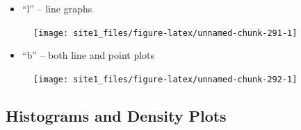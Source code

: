 \documentclass[]{book}
\newenvironment{Shaded}{\begin{snugshade}}{\end{snugshade}}
\newcommand{\KeywordTok}[1]{\textcolor[rgb]{0.13,0.29,0.53}{\textbf{#1}}}
\newcommand{\DataTypeTok}[1]{\textcolor[rgb]{0.13,0.29,0.53}{#1}}
\newcommand{\StringTok}[1]{\textcolor[rgb]{0.31,0.60,0.02}{#1}}
\newcommand{\CommentTok}[1]{\textcolor[rgb]{0.56,0.35,0.01}{\textit{#1}}}
\newcommand{\OperatorTok}[1]{\textcolor[rgb]{0.81,0.36,0.00}{\textbf{#1}}}
\newcommand{\NormalTok}[1]{#1}
\providecommand{\tightlist}{%
  \setlength{\itemsep}{0pt}\setlength{\parskip}{0pt}}
\begin{document}
\begin{itemize}
\tightlist
\item
  ``l'' -- line graphs
\end{itemize}

\begin{Shaded}
\end{Shaded}

\begin{figure}

{\centering \texttt{[image: site1\_files/figure-latex/unnamed-chunk-291-1]} 

}

\caption{ }\label{fig:unnamed-chunk-291}
\end{figure}

\begin{itemize}
\tightlist
\item
  ``b'' -- both line and point plots
\end{itemize}

\begin{Shaded}
\end{Shaded}

\begin{figure}

{\centering \texttt{[image: site1\_files/figure-latex/unnamed-chunk-292-1]} 

}

\caption{ }\label{fig:unnamed-chunk-292}
\end{figure}

\subsection{Histograms and Density
Plots}\label{histograms-and-density-plots}
\end{document}
